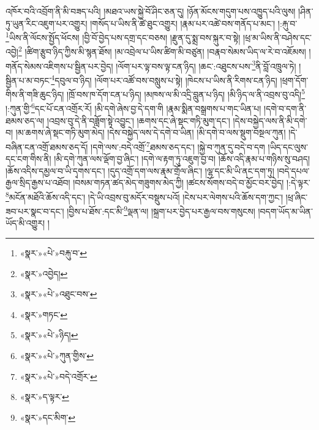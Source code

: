 འཁོར་བའི་འབྲོག་ནི་མི་བཟད་པའི། །མཐའ་ཡས་སྐྱེ་བོ་ཤིང་ཅན་དུ། །ཉོན་མོངས་གདུག་པས་འཁྱུད་པའི་ལུས། །ཤིན་ཏུ་ཡུན་རིང་འཇུག་པར་འགྱུར། །གསོད་པ་ཡིས་ནི་ཚེ་ཐུང་འགྱུར། །རྣམ་པར་འཚེ་བས་གནོད་པ་མང་། །:རྐུ་བ་\footnote{«སྣར་»«པེ་»བརྐུ་བ་}ཡིས་ནི་ལོངས་སྤྱོད་ཕོངས། །བྱི་བོ་བྱེད་པས་དགྲ་དང་བཅས། །རྫུན་དུ་སྨྲ་བས་སྐུར་བ་སྟེ། །ཕྲ་མ་ཡིས་ནི་བཤེས་དང་འབྱེ།\footnote{«སྣར་»འབྱེད།} །ཚིག་རྩུབ་ཉིད་ཀྱིས་མི་སྙན་ཐོས། །མ་འབྲེལ་པ་ཡིས་ཚིག་མི་བཙུན། །བརྣབ་སེམས་ཡིད་ལ་རེ་བ་འཇོམས། །གནོད་སེམས་འཇིགས་པ་སྦྱིན་པར་བྱེད། །ལོག་པར་ལྟ་བས་ལྟ་ངན་ཉིད། །ཆང་:འཐུངས་པས་\footnote{«སྣར་»«པེ་»འཐུང་བས་}ནི་བློ་འཁྲུལ་ཏེ། །སྦྱིན་པ་མ་བཏང་\footnote{«སྣར་»གཏང་}དབུལ་བ་ཉིད། །ལོག་པར་འཚོ་བས་བསླུས་པ་སྟེ། །ཁེངས་པ་ཡིས་ནི་རིགས་ངན་ཉིད། །ཕྲག་དོག་གིས་ནི་གཟི་ཆུང་ཉིད། །ཁྲོ་བས་ཁ་དོག་ངན་པ་ཉིད། །མཁས་ལ་མི་འདྲི་བླུན་པ་ཉིད། །མི་ཉིད་ལ་ནི་འབྲས་བུ་འདི།\footnote{«སྣར་»«པེ་»ཉིད།} །:ཀུན་གྱི་\footnote{«སྣར་»«པེ་»ཀུན་གྱིས་}དང་པོ་ངན་འགྲོར་རོ། །མི་དགེ་ཞེས་བྱ་དེ་དག་གི །རྣམ་སྨིན་བསྒྲགས་པ་གང་ཡིན་པ། །དགེ་བ་དག་ནི་ཐམས་ཅད་ལ། །འབྲས་བུ་དེ་ནི་བཟློག་སྟེ་འབྱུང་། །ཆགས་དང་ཞེ་སྡང་གཏི་མུག་དང་། །དེས་བསྐྱེད་ལས་ནི་མི་དགེ་བ། །མ་ཆགས་ཞེ་སྡང་གཏི་མུག་མེད། །དེས་བསྐྱེད་ལས་དེ་དགེ་བ་ཡིན། །མི་དགེ་བ་ལས་སྡུག་བསྔལ་ཀུན། །དེ་བཞིན་ངན་འགྲོ་ཐམས་ཅད་དོ། །དགེ་ལས་:བདེ་འགྲོ་\footnote{«སྣར་»«པེ་»བདེ་འགྲོར་}ཐམས་ཅད་དང་། །སྐྱེ་བ་ཀུན་དུ་བདེ་བ་དག །ཡིད་དང་ལུས་དང་ངག་གིས་ནི། །མི་དགེ་ཀུན་ལས་ལྡོག་བྱ་ཞིང་། །དགེ་ལ་རྟག་ཏུ་འཇུག་བྱ་བ། །ཆོས་འདི་རྣམ་པ་གཉིས་སུ་བཤད། །ཆོས་འདིས་དམྱལ་བ་ཡི་དྭགས་དང་། །དུད་འགྲོ་དག་ལས་རྣམ་གྲོལ་ཞིང་། །ལྷ་དང་མི་ཡི་ནང་དག་ཏུ། །བདེ་དཔལ་རྒྱལ་སྲིད་རྒྱས་པ་འཐོབ། །བསམ་གཏན་ཚད་མེད་གཟུགས་མེད་ཀྱི། །ཚངས་སོགས་བདེ་བ་མྱོང་བར་བྱེད། །:དེ་ལྟར་\footnote{«སྣར་»ད་ལྟར་}མངོན་མཐོའི་ཆོས་འདི་དང་། །དེ་ཡི་འབྲས་བུ་མདོར་བསྡུས་པའོ། །ངེས་པར་ལེགས་པའི་ཆོས་དག་ཀྱང་། །ཕྲ་ཞིང་ཟབ་པར་སྣང་བ་དང་། །བྱིས་པ་ཐོས་:དང་མི་\footnote{«སྣར་»དང་མིག་}ལྡན་ལ། །སྐྲག་པར་བྱེད་པར་རྒྱལ་བས་གསུངས། །བདག་ཡོད་མ་ཡིན་ཡོད་མི་འགྱུར། །
